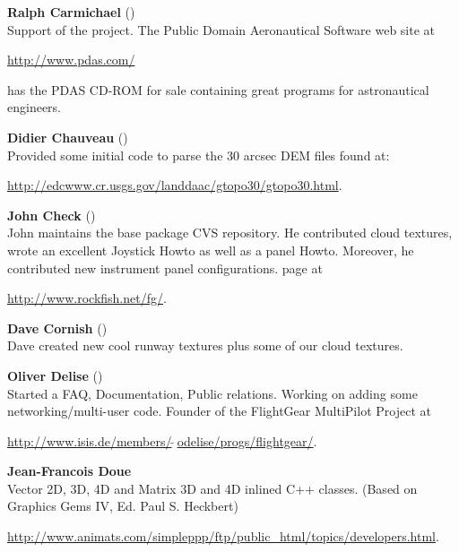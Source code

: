 \noindent \textbf{Ralph Carmichael} ()\\
  Support of the project. The Public Domain Aeronautical Software web site at
\medskip

\href{http://www.pdas.com/}{http://www.pdas.com/}
 \medskip

 \noindent
 has the PDAS CD-ROM for sale containing great programs for astronautical engineers.

\noindent \textbf{Didier Chauveau}
()\\
  Provided some initial code to parse the 30 arcsec DEM files found at:
   \medskip

  \href{http://edcwww.cr.usgs.gov/landdaac/gtopo30/gtopo30.html}{http://edcwww.cr.usgs.gov/landdaac/gtopo30/gtopo30.html}.
 \medskip

\noindent \textbf{John Check} ()\\
 John maintains the base package CVS repository. He contributed cloud textures, wrote an excellent Joystick Howto as well as a panel Howto. Moreover, he contributed new instrument panel configurations. \FlightGear{}
 page at
 \medskip

 \href{http://www.rockfish.net/fg/}{http://www.rockfish.net/fg/}.
 \medskip

\noindent \textbf{Dave Cornish} ()\\
 Dave created new cool runway textures plus some of our cloud textures.
 \medskip

\noindent \textbf{Oliver Delise}  ()\\
 Started a FAQ, Documentation, Public relations. Working on adding some
  networking/multi-user code. Founder of the FlightGear MultiPilot
  Project at
   \medskip

  \href{http://www.isis.de/members/~odelise/progs/flightgear/}{http://www.isis.de/members/$\tilde{~~}$odelise/progs/flightgear/}.
\medskip

\noindent \textbf{Jean-Francois Doue}\\
  Vector 2D, 3D, 4D and Matrix 3D and 4D inlined C++ classes.  (Based on
  Graphics Gems IV, Ed. Paul S. Heckbert)
  \medskip

\href{http://www.animats.com/simpleppp/ftp/public_html/topics/developers.html}{http://www.animats.com/simpleppp/ftp/public\_html/topics/developers.html}.
 \medskip

